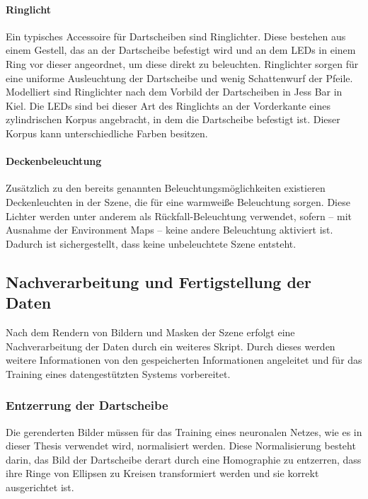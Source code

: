 \paragraph{Ringlicht}

Ein typisches Accessoire für Dartscheiben sind Ringlichter. Diese bestehen aus einem Gestell, das an der Dartscheibe befestigt wird und an dem LEDs in einem Ring vor dieser angeordnet, um diese direkt zu beleuchten. Ringlichter sorgen für eine uniforme Ausleuchtung der Dartscheibe und wenig Schattenwurf der Pfeile. Modelliert sind Ringlichter nach dem Vorbild der Dartscheiben in Jess Bar in Kiel. Die LEDs sind bei dieser Art des Ringlichts an der Vorderkante eines zylindrischen Korpus angebracht, in dem die Dartscheibe befestigt ist. Dieser Korpus kann unterschiedliche Farben besitzen.

\paragraph{Deckenbeleuchtung}

Zusätzlich zu den bereits genannten Beleuchtungsmöglichkeiten existieren Deckenleuchten in der Szene, die für eine warmweiße Beleuchtung sorgen. Diese Lichter werden unter anderem als Rückfall-Beleuchtung verwendet, sofern -- mit Ausnahme der Environment Maps -- keine andere Beleuchtung aktiviert ist. Dadurch ist sichergestellt, dass keine unbeleuchtete Szene entsteht.


\subsection{Nachverarbeitung und Fertigstellung der Daten}  %
\label{sec:methodik_postprocessing}

Nach dem Rendern von Bildern und Masken der Szene erfolgt eine Nachverarbeitung der Daten durch ein weiteres Skript. Durch dieses werden weitere Informationen von den gespeicherten Informationen angeleitet und für das Training eines datengestützten Systems vorbereitet.

\subsubsection{Entzerrung der Dartscheibe}

Die gerenderten Bilder müssen für das Training eines neuronalen Netzes, wie es in dieser Thesis verwendet wird, normalisiert werden. Diese Normalisierung besteht darin, das Bild der Dartscheibe derart durch eine Homographie zu entzerren, dass ihre Ringe von Ellipsen zu Kreisen transformiert werden und sie korrekt ausgerichtet ist.

